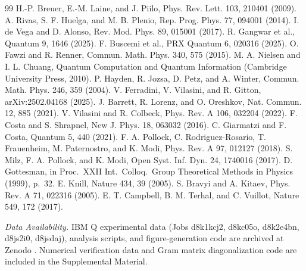 \documentclass[twocolumn,aps,prl,floatfix]{revtex4-2}
\begin{document}
\begin{thebibliography}{99}
 H.-P. Breuer, E.-M. Laine, and J. Piilo, Phys. Rev. Lett. 103, 210401 (2009).
 A. Rivas, S. F. Huelga, and M. B. Plenio, Rep. Prog. Phys. 77, 094001 (2014).
 I. de Vega and D. Alonso, Rev. Mod. Phys. 89, 015001 (2017).
 R. Gangwar et al., Quantum 9, 1646 (2025).
 F. Buscemi et al., PRX Quantum 6, 020316 (2025).
 O. Fawzi and R. Renner, Commun. Math. Phys. 340, 575 (2015).
 M. A. Nielsen and I. L. Chuang, Quantum Computation and Quantum Information (Cambridge University Press, 2010).
 P. Hayden, R. Jozsa, D. Petz, and A. Winter, Commun. Math. Phys. 246, 359 (2004).
 V. Ferradini, V. Vilasini, and R. Gitton, arXiv:2502.04168 (2025).
 J. Barrett, R. Lorenz, and O. Oreshkov, Nat. Commun. 12, 885 (2021).
 V. Vilasini and R. Colbeck, Phys. Rev. A 106, 032204 (2022).
 F. Costa and S. Shrapnel, New J. Phys. 18, 063032 (2016).
 C. Giarmatzi and F. Costa, Quantum 5, 440 (2021).
 F. A. Pollock, C. Rodriguez-Rosario, T. Frauenheim, M. Paternostro, and K. Modi, Phys. Rev. A 97, 012127 (2018).
 S. Milz, F. A. Pollock, and K. Modi, Open Syst. Inf. Dyn. 24, 1740016 (2017).
 D. Gottesman, in Proc.\ XXII Int.\ Colloq.\ Group Theoretical Methods in Physics (1999), p.\ 32.
 E. Knill, Nature 434, 39 (2005).
 S. Bravyi and A. Kitaev, Phys. Rev. A 71, 022316 (2005).
 E. T. Campbell, B. M. Terhal, and C. Vuillot, Nature 549, 172 (2017).
\end{thebibliography}

\vspace{6pt}
\noindent\textit{Data Availability.} IBM Q experimental data (Jobs d8k1kcj2, d8kc05o, d8k2e4bn, d8js2i0, d8jsdaj), analysis scripts, and figure-generation code are archived at Zenodo \cite{doi:10.5281/zenodo.20619265}. Numerical verification data and Gram matrix diagonalization code are included in the Supplemental Material.
\end{document}
